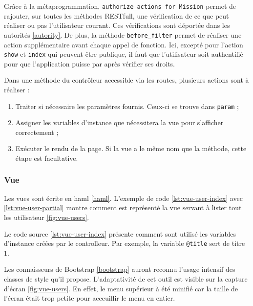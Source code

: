Grâce à la métaprogrammation, \lstinline[language=Rails]{authorize_actions_for Mission} permet de rajouter, sur toutes les méthodes RESTfull, une vérification de ce que peut réaliser ou pas l'utilisateur courant. Ces vérifications sont déportée dans les autorités \ref{autority}. De plus, la méthode \lstinline[language=Rails]{before_filter} permet de réaliser une action supplémentaire avant chaque appel de fonction. Ici, excepté pour l'action \texttt{show} et \texttt{index} qui peuvent être publique, il faut que l'utilisateur soit authentifié pour que l'application puisse par après vérifier ses droits.

Dans une méthode du contrôleur accessible via les routes, plusieurs actions sont à réaliser :
\begin{enumerate}
  \item Traiter si nécessaire les paramètres fournis. Ceux-ci se trouve dans \lstinline[language=Rails]{param} ;
  \item Assigner les variables d'instance que nécessitera la vue pour s'afficher correctement ;
  \item Exécuter le rendu de la page. Si la vue a le même nom que la méthode, cette étape est facultative.
\end{enumerate}

\subsubsection{Vue}
Les vues sont écrite en haml \ref{haml}. L'exemple de code \ref{lst:vue-user-index} avec \ref{lst:vue-user-partial} montre comment est représenté la vue servant à lister tout les utilisateur \ref{fig:vue-users}.

%
Le code source \ref{lst:vue-user-index} présente comment sont utilisé les variables d'instance créées par le controlleur. Par exemple, la variable \texttt{@title} sert de titre 1.


Les connaisseurs de Bootstrap \ref{bootstrap} auront reconnu l'usage intensif des classes de style qu'il propose. L'adaptativité de cet outil est visible sur la capture d'écran \ref{fig:vue-users}. En effet, le menu supérieur à été minifié car la taille de l'écran était trop petite pour acceuillir le menu en entier.

